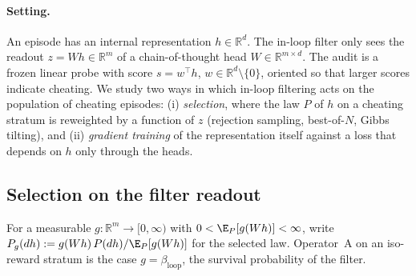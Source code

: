 \paragraph{Setting.} An episode has an internal representation $h \in \mathbb{R}^d$. The in-loop filter only sees the readout $z = W h \in \mathbb{R}^m$ of a chain-of-thought head $W \in \mathbb{R}^{m \times d}$. The audit is a frozen linear probe with score $s = w^\top h$, $w \in \mathbb{R}^d \setminus \{0\}$, oriented so that larger scores indicate cheating. We study two ways in which in-loop filtering acts on the population of cheating episodes: (i) \emph{selection}, where the law $P$ of $h$ on a cheating stratum is reweighted by a function of $z$ (rejection sampling, best-of-$N$, Gibbs tilting), and (ii) \emph{gradient training} of the representation itself against a loss that depends on $h$ only through the heads.

\subsection{Selection on the filter readout}

For a measurable $g : \mathbb{R}^m \to [0, \infty)$ with $0 < \E_P[g(Wh)] < \infty$, write $P_g(dh) := g(Wh)\, P(dh) / \E_P[g(Wh)]$ for the selected law. Operator~A on an iso-reward stratum is the case $g = \beta_{\mathrm{loop}}$, the survival probability of the filter.

